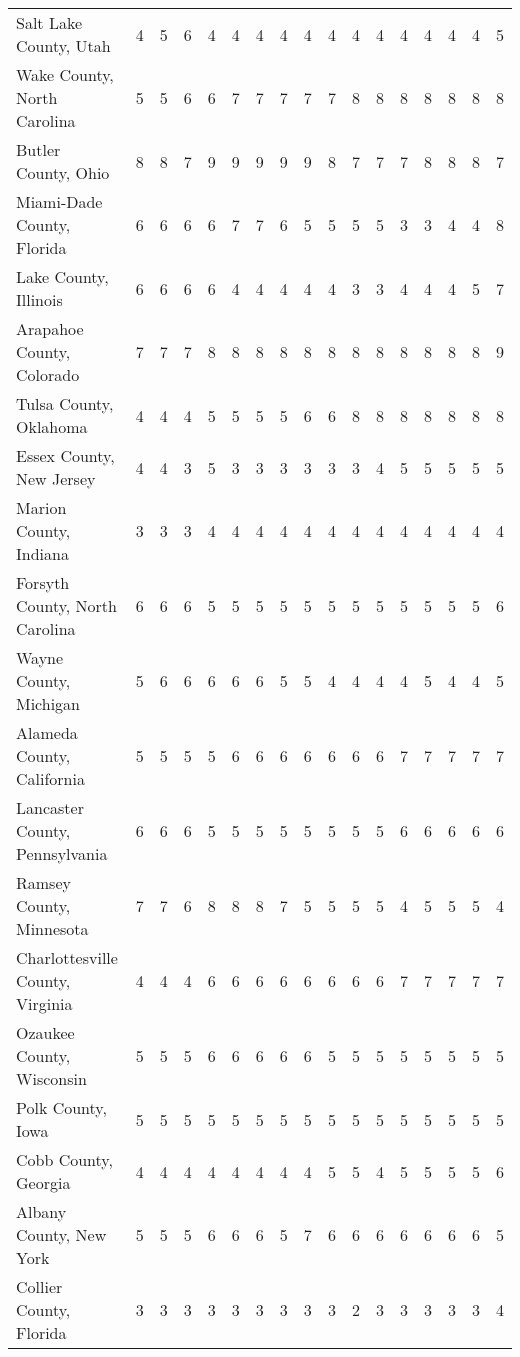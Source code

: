 \begin{landscape}
\begin{longtable}{lcccccccccccccccc}
Salt Lake County, Utah & 4 & 5 & 6 & 4 & 4 & 4 & 4 & 4 & 4 & 4 & 4 & 4 & 4 & 4 & 4 & 5 \\
Wake County, North Carolina & 5 & 5 & 6 & 6 & 7 & 7 & 7 & 7 & 7 & 8 & 8 & 8 & 8 & 8 & 8 & 8 \\
Butler County, Ohio & 8 & 8 & 7 & 9 & 9 & 9 & 9 & 9 & 8 & 7 & 7 & 7 & 8 & 8 & 8 & 7 \\
Miami-Dade County, Florida & 6 & 6 & 6 & 6 & 7 & 7 & 6 & 5 & 5 & 5 & 5 & 3 & 3 & 4 & 4 & 8 \\
Lake County, Illinois & 6 & 6 & 6 & 6 & 4 & 4 & 4 & 4 & 4 & 3 & 3 & 4 & 4 & 4 & 5 & 7 \\
Arapahoe County, Colorado & 7 & 7 & 7 & 8 & 8 & 8 & 8 & 8 & 8 & 8 & 8 & 8 & 8 & 8 & 8 & 9 \\
Tulsa County, Oklahoma & 4 & 4 & 4 & 5 & 5 & 5 & 5 & 6 & 6 & 8 & 8 & 8 & 8 & 8 & 8 & 8 \\
Essex County, New Jersey & 4 & 4 & 3 & 5 & 3 & 3 & 3 & 3 & 3 & 3 & 4 & 5 & 5 & 5 & 5 & 5 \\
Marion County, Indiana & 3 & 3 & 3 & 4 & 4 & 4 & 4 & 4 & 4 & 4 & 4 & 4 & 4 & 4 & 4 & 4 \\
Forsyth County, North Carolina & 6 & 6 & 6 & 5 & 5 & 5 & 5 & 5 & 5 & 5 & 5 & 5 & 5 & 5 & 5 & 6 \\
Wayne County, Michigan & 5 & 6 & 6 & 6 & 6 & 6 & 5 & 5 & 4 & 4 & 4 & 4 & 5 & 4 & 4 & 5 \\
Alameda County, California & 5 & 5 & 5 & 5 & 6 & 6 & 6 & 6 & 6 & 6 & 6 & 7 & 7 & 7 & 7 & 7 \\
Lancaster County, Pennsylvania & 6 & 6 & 6 & 5 & 5 & 5 & 5 & 5 & 5 & 5 & 5 & 6 & 6 & 6 & 6 & 6 \\
Ramsey County, Minnesota & 7 & 7 & 6 & 8 & 8 & 8 & 7 & 5 & 5 & 5 & 5 & 4 & 5 & 5 & 5 & 4 \\
Charlottesville County, Virginia & 4 & 4 & 4 & 6 & 6 & 6 & 6 & 6 & 6 & 6 & 6 & 7 & 7 & 7 & 7 & 7 \\
Ozaukee County, Wisconsin & 5 & 5 & 5 & 6 & 6 & 6 & 6 & 6 & 5 & 5 & 5 & 5 & 5 & 5 & 5 & 5 \\
Polk County, Iowa & 5 & 5 & 5 & 5 & 5 & 5 & 5 & 5 & 5 & 5 & 5 & 5 & 5 & 5 & 5 & 5 \\
Cobb County, Georgia & 4 & 4 & 4 & 4 & 4 & 4 & 4 & 4 & 5 & 5 & 4 & 5 & 5 & 5 & 5 & 6 \\
Albany County, New York & 5 & 5 & 5 & 6 & 6 & 6 & 5 & 7 & 6 & 6 & 6 & 6 & 6 & 6 & 6 & 5 \\
Collier County, Florida & 3 & 3 & 3 & 3 & 3 & 3 & 3 & 3 & 3 & 2 & 3 & 3 & 3 & 3 & 3 & 4 \\

\end{longtable}
\end{landscape}
